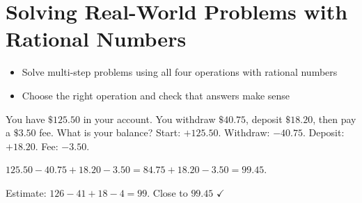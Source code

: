 \section{Solving Real-World Problems with Rational Numbers}

\begin{stepGoal}
\begin{itemize}
    \item Solve multi-step problems using all four operations with rational numbers
    \item Choose the right operation and check that answers make sense
\end{itemize}
\end{stepGoal}

\begin{stepVocabBox}
\end{stepVocabBox}

\begin{stepsCard}
\end{stepsCard}

\begin{stepExample}{You have $\$125.50$ in your account. You withdraw $\$40.75$, deposit $\$18.20$, then pay a $\$3.50$ fee. What is your balance?}
     Start: $+125.50$. Withdraw: $-40.75$. Deposit: $+18.20$. Fee: $-3.50$.

     $125.50 - 40.75 + 18.20 - 3.50 = 84.75 + 18.20 - 3.50 = 99.45$.

     Estimate: $126 - 41 + 18 - 4 = 99$. Close to $99.45$ $\checkmark$
\end{stepExample}

